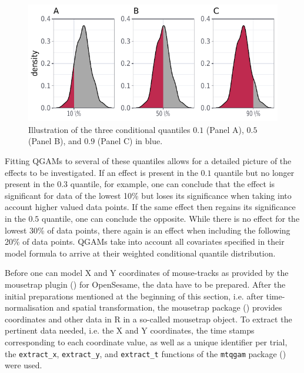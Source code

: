 \begin{figure}
    \centering
    \includegraphics[]{figures/fig7.9.pdf}
    \caption{Illustration of the three conditional quantiles $0.1$ (Panel A), $0.5$ (Panel B), and $0.9$ (Panel C) in blue.}
    \label{fig:7_9}
\end{figure}

Fitting QGAMs to several of these quantiles allows for a detailed picture of the effects to be investigated. If an effect is present in the $0.1$ quantile but no longer present in the $0.3$ quantile, for example, one can conclude that the effect is significant for data of the lowest 10\% but loses its significance when taking into account higher valued data points. If the same effect then regains its significance in the $0.5$ quantile, one can conclude the opposite. While there is no effect for the lowest 30\% of data points, there again is an effect when including the following 20\% of data points. QGAMs take into account all covariates specified in their model formula to arrive at their weighted conditional quantile distribution. 

Before one can model X and Y coordinates of mouse-tracks as provided by the mousetrap plugin (\cite{Kieslich2017}) for OpenSesame, the data have to be prepared. After the initial preparations mentioned at the beginning of this section, i.e. after time-normalisation and spatial transformation, the mousetrap package (\cite{Kieslich2019}) provides coordinates and other data in R in a so-called mousetrap object. To extract the pertinent data needed, i.e. the X and Y coordinates, the time stamps corresponding to each coordinate value, as well as a unique identifier per trial, the \texttt{extract\_x}, \texttt{extract\_y}, and \texttt{extract\_t} functions of the \texttt{mtqgam} package (\cite{Schmitz2021mtqgam}) were used. 

